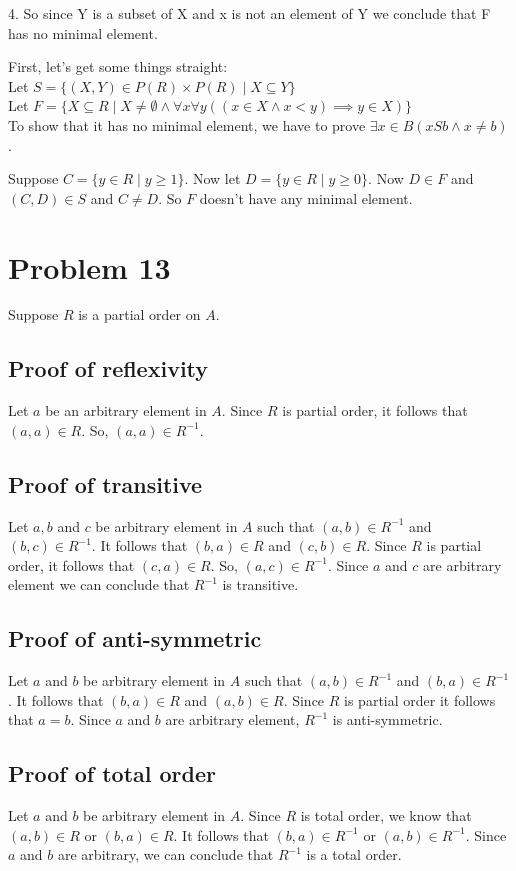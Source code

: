 \documentclass{article}
\begin{document}
4. So since Y is a subset of X and x is not an element of Y we conclude that F has no minimal element.


First, let's get some things straight: \\
Let $S = \{(X,Y) \in P(R) \times P(R) \mid X \subseteq Y\}$ \\
Let $F = \{X \subseteq R \mid X \neq \emptyset \land \forall x \forall
y ((x \in X \land x < y) \implies y \in X)\}$ \\

To show that it has no minimal element, we have to prove $\exists x
\in B(xSb \land x \neq b)$.

Suppose $C = \{y \in R \mid y \geq 1\}$. Now let $D = \{y \in R \mid y
\geq 0\}$. Now $D \in F$ and $(C,D) \in S$ and $C \neq D$. So $F$
doesn't have any minimal element.

\section{Problem 13}
Suppose $R$ is a partial order on $A$.
\subsection{Proof of reflexivity}
Let $a$ be an arbitrary element in $A$. Since $R$ is partial order, it
follows that $(a,a) \in R$. So, $(a,a) \in R^{-1}$.
\subsection{Proof of transitive}
Let $a,b$ and $c$ be arbitrary element in $A$ such that $(a,b) \in
R^{-1}$ and $(b,c) \in R^{-1}$. It follows that $(b,a) \in R$ and
$(c,b) \in R$. Since $R$ is partial order, it follows that $(c,a) \in
R$. So, $(a,c) \in R^{-1}$. Since $a$ and $c$ are arbitrary element we
can conclude that $R^{-1}$ is transitive.
\subsection{Proof of anti-symmetric}
Let $a$ and $b$ be arbitrary element in $A$ such that $(a,b) \in
R^{-1}$ and $(b,a) \in R^{-1}$. It follows that $(b,a) \in R$ and
$(a,b) \in R$. Since $R$ is partial order it follows that $a = b$.
Since $a$ and $b$ are arbitrary element, $R^{-1}$ is anti-symmetric.
\subsection{Proof of total order}
Let $a$ and $b$ be arbitrary element in $A$. Since $R$ is total order,
we know that $(a,b) \in R$ or $(b,a) \in R$. It follows that $(b,a)
\in R^{-1}$ or $(a,b) \in R^{-1}$. Since $a$ and $b$ are arbitrary, we
can conclude that $R^{-1}$ is a total order.
\end{document}
